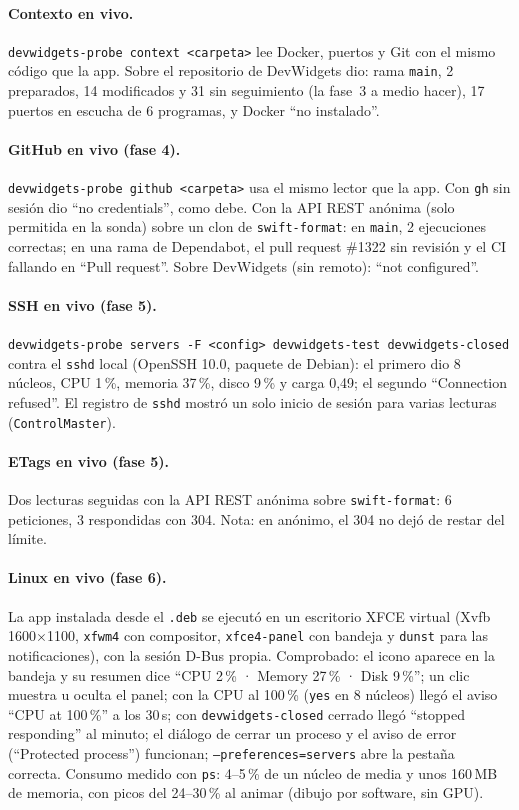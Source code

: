 \documentclass[11pt,a4paper]{article}
\begin{document}
\paragraph{Contexto en vivo.} \texttt{devwidgets-probe context
<carpeta>} lee Docker, puertos y Git con el mismo código que la app.
Sobre el repositorio de DevWidgets dio: rama \texttt{main}, 2
preparados, 14 modificados y 31 sin seguimiento (la fase~3 a medio
hacer), 17 puertos en escucha de 6 programas, y Docker ``no
instalado''.

\paragraph{GitHub en vivo (fase 4).} \texttt{devwidgets-probe github
<carpeta>} usa el mismo lector que la app. Con \texttt{gh} sin sesión
dio ``no credentials'', como debe. Con la API REST anónima (solo
permitida en la sonda) sobre un clon de \texttt{swift-format}: en
\texttt{main}, 2 ejecuciones correctas; en una rama de Dependabot, el
pull request \#1322 sin revisión y el CI fallando en ``Pull
request''. Sobre DevWidgets (sin remoto): ``not configured''.

\paragraph{SSH en vivo (fase 5).} \texttt{devwidgets-probe servers
-F <config> devwidgets-test devwidgets-closed} contra el
\texttt{sshd} local (OpenSSH 10.0, paquete de Debian): el primero dio
8 núcleos, CPU 1\,\%, memoria 37\,\%, disco 9\,\% y carga 0,49; el
segundo ``Connection refused''. El registro de \texttt{sshd} mostró un
solo inicio de sesión para varias lecturas (\texttt{ControlMaster}).

\paragraph{ETags en vivo (fase 5).} Dos lecturas seguidas con la API
REST anónima sobre \texttt{swift-format}: 6 peticiones, 3 respondidas
con 304. Nota: en anónimo, el 304 no dejó de restar del límite.

\paragraph{Linux en vivo (fase 6).} La app instalada desde el
\texttt{.deb} se ejecutó en un escritorio XFCE virtual (Xvfb
1600$\times$1100, \texttt{xfwm4} con compositor, \texttt{xfce4-panel}
con bandeja y \texttt{dunst} para las notificaciones), con la sesión
D-Bus propia. Comprobado: el icono aparece en la bandeja y su resumen
dice ``CPU 2\,\% · Memory 27\,\% · Disk 9\,\%''; un clic muestra u
oculta el panel; con la CPU al 100\,\% (\texttt{yes} en 8 núcleos)
llegó el aviso ``CPU at 100\,\%'' a los 30\,s; con
\texttt{devwidgets-closed} cerrado llegó ``stopped responding'' al
minuto; el diálogo de cerrar un proceso y el aviso de error
(``Protected process'') funcionan; \texttt{--preferences=servers}
abre la pestaña correcta. Consumo medido con \texttt{ps}: 4--5\,\% de
un núcleo de media y unos 160\,MB de memoria, con picos del
24--30\,\% al animar (dibujo por software, sin GPU).
\end{document}
